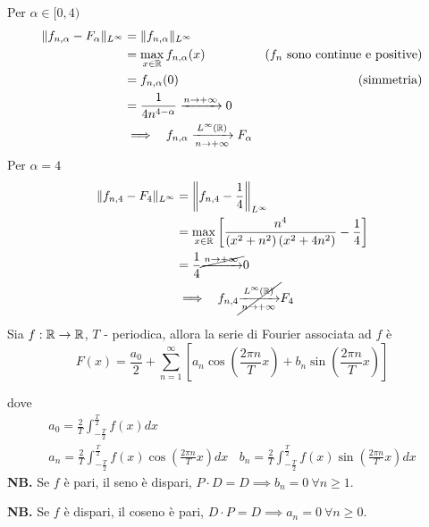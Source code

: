 \begin{enumerate}
Per $\alpha \in [ 0, 4)$
\begin{equation*}
\begin{aligned}
\Vert f_{n, \alpha} - F_{\alpha}\Vert_{L^{\infty}} & = \Vert f_{n, \alpha}\Vert_{L^{\infty}} & \\
 & = \max_{x\in \mathbb{R}} f_{n, \alpha}(x) & \left(f_{n} \ \text{sono continue e positive}\right)\\
 & = f_{n, \alpha}(0) & \text{(simmetria)}\\
 & = \frac{1}{4n^{4 - \alpha}}\xrightarrow{n\rightarrow + \infty} 0 & \\
 & \implies \ \ f_{n, \alpha}\xrightarrow[n\rightarrow + \infty ]{L^{\infty}(\mathbb{R})} F_{\alpha} & 
\end{aligned}
\end{equation*}Per $\alpha = 4$
\begin{equation*}
\begin{aligned}
\Vert f_{n, 4} - F_{4}\Vert_{L^{\infty}} & = \left\Vert f_{n, 4} - \frac{1}{4}\right\Vert_{L^{\infty}}\\
 & = \max_{x\in \mathbb{R}}\left[\frac{n^{4}}{\left(x^{2} + n^{2}\right)\left(x^{2} + 4n^{2}\right)} - \frac{1}{4}\right]\\
 & = \frac{1}{4}\cancel{\xrightarrow{n\rightarrow + \infty}} 0\\
 & \implies \ \ f_{n, 4}\cancel{\xrightarrow[n\rightarrow + \infty ]{L^{\infty}(\mathbb{R})}} F_{4}
\end{aligned}
\end{equation*}
\end{enumerate}
\Soluzione
\begin{thm}
Sia $f:\mathbb{R} \rightarrow \mathbb{R} $, $T$ - periodica, allora la serie di Fourier associata ad $f$ è
\begin{equation*}
F(x) = \frac{a_{0}}{2} + \sum\limits^{\infty}_{n = 1}\left[ a_{n}\cos\left(\frac{2\pi n}{T} x\right) + b_{n}\sin\left(\frac{2\pi n}{T} x\right)\right]
\end{equation*}

dove
\begin{gather*}
a_{0} = \frac{2}{T}\int^{\frac{T}{2}}_{- \frac{T}{2}} f(x) dx\\
a_{n} = \frac{2}{T}\int^{\frac{T}{2}}_{- \frac{T}{2}} f(x)\cos\left(\frac{2\pi n}{T} x\right) dx\ \ \ \ b_{n} = \frac{2}{T}\int^{\frac{T}{2}}_{- \frac{T}{2}} f(x)\sin\left(\frac{2\pi n}{T} x\right) dx
\end{gather*}
\textbf{NB.} Se $f$ è pari, il seno è dispari, $P \cdot D = D\implies b_{n} = 0\ \forall n \geq 1$.

\textbf{NB.} Se $f$ è dispari, il coseno è pari, $D \cdot P = D\implies a_{n} = 0\ \forall n \geq 0$.
\end{thm}

